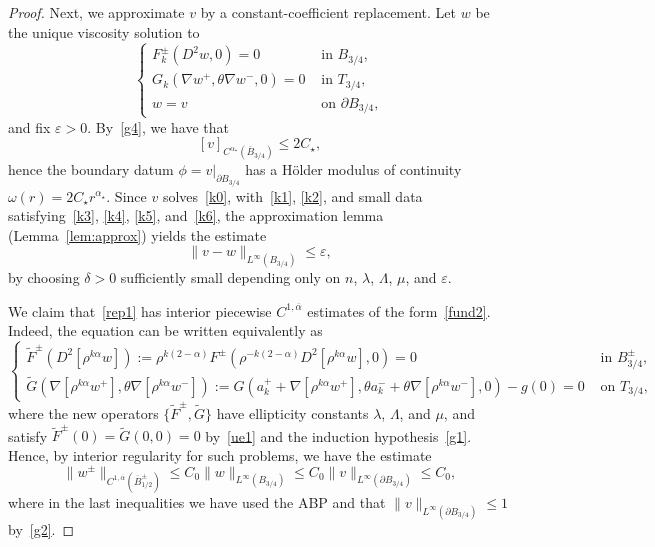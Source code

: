 \documentclass[letter,11pt]{amsart}
\newcommand{\vep}{\varepsilon}
\newcommand{\mao}{\alpha_{\star}}
\theoremstyle{definition}
\numberwithin{equation}{section}
\begin{document}
\begin{proof}
Next, we approximate $v$ by a constant-coefficient replacement.
Let $w$ be the unique viscosity solution to 
\begin{equation}
\label{rep1}
\begin{cases}
F_k^{\pm}(D^2 w, 0) = 0 & \text{ in } B_{3/4},\\
G_k(\nabla w^{+}, \theta \nabla w^{-}, 0) = 0 & \text{ in } T_{3/4},\\
w = v & \text{ on } \partial B_{3/4},
\end{cases}
\end{equation}
and fix $\vep > 0$.
By~\eqref{g4}, we have that
\[
[v]_{C^{\mao}(\overline{B}_{3/4})} \leq 2C_{\star},
\]
hence the boundary datum $\phi = v|_{\partial B_{3/4}}$ has a H\"{o}lder modulus of continuity 
$\omega(r) = 2 C_{\star} r^{\mao}$.
Since $v$ solves~\eqref{k0}, 
with~\eqref{k1}, \eqref{k2}, and small data satisfying~\eqref{k3}, \eqref{k4}, \eqref{k5}, and~\eqref{k6},
the approximation lemma (Lemma~\ref{lem:approx}) yields the estimate
\begin{equation}
\label{approx}
\|v-w\|_{L^{\infty}(B_{3/4})} \leq \vep,
\end{equation}
by choosing $\delta > 0$ sufficiently small depending only on 
$n$, $\lambda$, $\Lambda$, $\mu$, and $\vep$.

\medskip

We claim that~\eqref{rep1} has interior piecewise $C^{1,\overline{\alpha}}$ estimates of the form~\eqref{fund2}.
Indeed, the equation can be written equivalently as
\[
\begin{cases}
\widetilde{F}^{\pm}(D^2 [\rho^{k\alpha} w]) := 
\rho^{k(2-\alpha)}F^{\pm}(\rho^{-k(2-\alpha)} D^2 [\rho^{k\alpha} w], 0) = 0 & \text{ in }B_{3/4}^{\pm},\\
\widetilde{G}(\nabla[\rho^{k\alpha} w^{+}], \theta \nabla[\rho^{k\alpha} w^{-}])
:= G(a_k^{+} + \nabla[\rho^{k\alpha} w^{+}], \theta a_k^{-} + \theta \nabla[\rho^{k \alpha} w^{-}], 0) - g(0) = 0 & \text{ on } T_{3/4},
\end{cases}
\]
where the new operators $\{\widetilde{F}^{\pm}, \widetilde{G}\}$ have ellipticity constants $\lambda$, $\Lambda$, and $\mu$, and satisfy $\widetilde{F}^{\pm}(0) = \widetilde{G}(0, 0) = 0$ by~\eqref{ue1} and the induction hypothesis~\eqref{g1}.
Hence, by interior regularity for such problems, we have the estimate
\begin{equation}
\label{rep2}
\|w^{\pm}\|_{C^{1,\overline{\alpha}}(\overline{B}^{\pm}_{1/2})} \leq C_0 \|w\|_{L^{\infty}(B_{3/4})}
\leq C_0 \|v\|_{L^{\infty}(\partial B_{3/4})} \leq C_0,
\end{equation}
where in the last inequalities we have used the ABP and that $\|v\|_{L^{\infty}(\partial B_{3/4})} \leq 1$ by~\eqref{g2}.


\end{proof}
\end{document}
